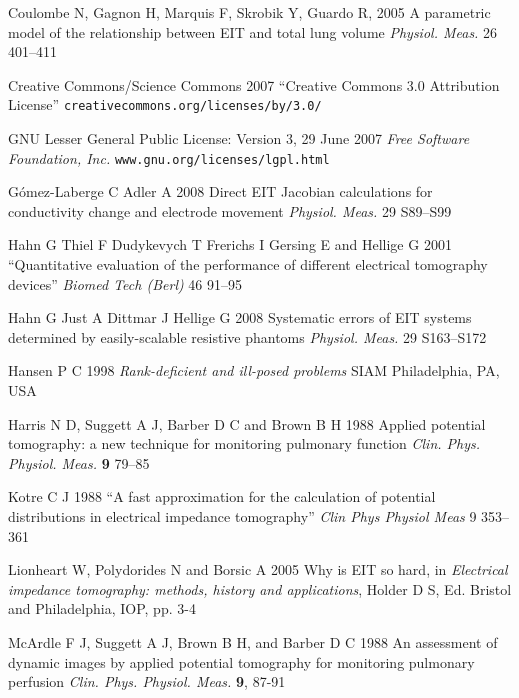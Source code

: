 \documentclass[12pt]{iopart}
\begin{document}
\item[]
Coulombe N, Gagnon H, Marquis F, Skrobik Y, Guardo R, 2005
A parametric model of the relationship between EIT and total lung volume
{\em Physiol. Meas.}
26 401--411


\item[]
Creative Commons/Science Commons 2007
``Creative Commons 3.0 Attribution License''
\verb+creativecommons.org/licenses/by/3.0/+

\item[]
GNU Lesser General Public License: Version 3, 29 June 2007
{\em Free Software Foundation, Inc.}
\verb+www.gnu.org/licenses/lgpl.html+

G\'omez-Laberge C Adler A 2008
Direct EIT Jacobian calculations for conductivity change and electrode movement
{\em Physiol. Meas.}
29 S89--S99


\item[]
Hahn G Thiel F Dudykevych T Frerichs I Gersing E
and Hellige G 2001
``Quantitative evaluation of the performance of
different electrical tomography devices''
{\em  Biomed Tech (Berl)}
46 91--95

\item[]
Hahn G Just A Dittmar J  Hellige G 2008
Systematic errors of EIT systems determined by easily-scalable
 resistive phantoms
{\em Physiol. Meas.}
 29 S163--S172


\item[]
Hansen P C 1998 {\em Rank-deficient and ill-posed problems}
SIAM Philadelphia, PA, USA

\item[]
Harris N D, Suggett A J, Barber D C and Brown B H 1988 Applied
potential tomography: a new technique for monitoring pulmonary
function {\em Clin. Phys. Physiol. Meas.} {\bf 9} 79--85


\item[]
Kotre C J 1988
``A fast approximation for the calculation of potential distributions in electrical impedance tomography''
{\em Clin Phys Physiol Meas}
9 353--361

\item[]
Lionheart W, Polydorides N and Borsic A 2005 Why is EIT so hard,
in {\em Electrical impedance tomography: methods, history and
applications}, Holder D S, Ed. Bristol and Philadelphia, IOP, pp.
3-4

\item[]
McArdle F J, Suggett A J, Brown B H, and Barber D C 1988 An
assessment of dynamic images by applied potential tomography for
monitoring pulmonary perfusion {\em Clin. Phys. Physiol. Meas.}
{\bf 9}, 87-91
\end{document}
